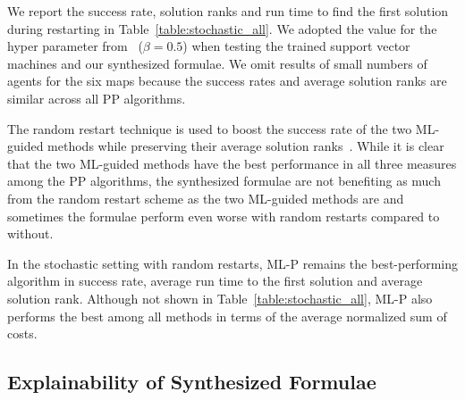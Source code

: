 \documentclass[letterpaper]{article}
\begin{document}
We report the success rate, solution ranks and run time to find the first solution during restarting in Table~\ref{table:stochastic_all}. We adopted the value for the hyper parameter from~\citet{zhang2022learning} ($ \beta = 0.5 $) when testing the trained support vector machines and our synthesized formulae. We omit results of small numbers of agents for the six maps because the success rates and average solution ranks are similar across all PP algorithms.

The random restart technique is used to boost the success rate of the two ML-guided methods while preserving their average solution ranks~\citep{zhang2022learning}. While it is clear that the two ML-guided methods have the best performance in all three measures among the PP algorithms, the synthesized formulae are not benefiting as much from the random restart scheme as the two ML-guided methods are and sometimes the formulae perform even worse with random restarts compared to without.

In the stochastic setting with random restarts, ML-P remains the best-performing algorithm in success rate, average run time to the first solution and average solution rank. Although not shown in Table~\ref{table:stochastic_all}, ML-P also performs the best among all methods in terms of the average normalized sum of costs.

\subsection{Explainability of Synthesized Formulae}
\label{sec:explain}
\end{document}
